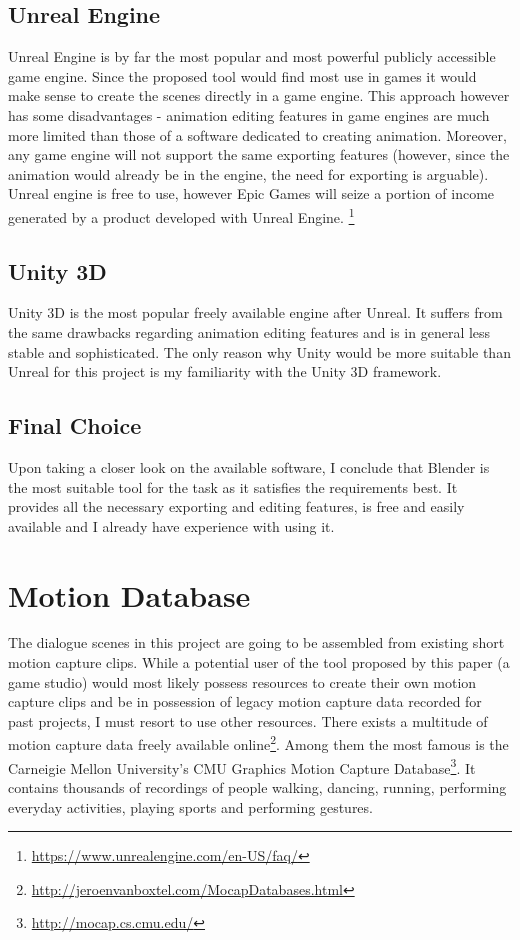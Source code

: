 \subsection{Unreal Engine}

Unreal Engine is by far the most popular and most powerful publicly accessible game engine. Since the proposed tool would find most use in games it would make sense to create the scenes directly in a game engine. This approach however has some disadvantages - animation editing features in game engines are much more limited than those of a software dedicated to creating animation. Moreover, any game engine will not support the same exporting features (however, since the animation would already be in the engine, the need for exporting is arguable). Unreal engine is free to use, however Epic Games will seize a portion of income generated by a product developed with Unreal Engine. \footnote{\url{https://www.unrealengine.com/en-US/faq/}}

\subsection{Unity 3D}

Unity 3D is the most popular freely available engine after Unreal. It suffers from the same drawbacks regarding animation editing features and is in general less stable and sophisticated. The only reason why Unity would be more suitable than Unreal for this project is my familiarity with the Unity 3D framework.


\subsection{Final Choice}

Upon taking a closer look on the available software, I conclude that Blender is the most suitable tool for the task as it satisfies the requirements best. It provides all the necessary exporting and editing features, is free and easily available and I already have experience with using it.



\section{Motion Database}

The dialogue scenes in this project are going to be assembled from existing short motion capture clips. While a potential user of the tool proposed by this paper (a game studio) would most likely possess resources to create their own motion capture clips and be in possession of legacy motion capture data recorded for past projects, I must resort to use other resources. There exists a multitude of motion capture data freely available online\footnote{\url{http://jeroenvanboxtel.com/MocapDatabases.html}}. Among them the most famous is the Carneigie Mellon University's CMU Graphics Motion Capture Database\footnote{\url{http://mocap.cs.cmu.edu/}}. It contains thousands of recordings of people walking, dancing, running, performing everyday activities, playing sports and performing gestures.

